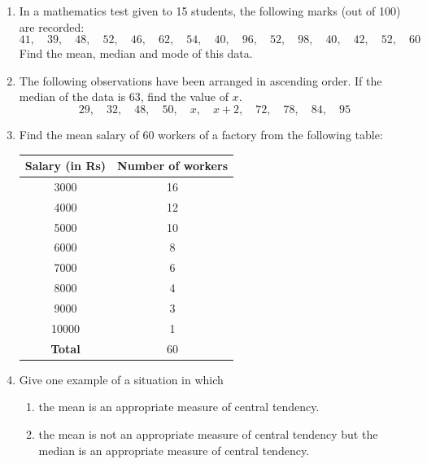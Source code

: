 \documentclass[a4paper,leqno,12pt]{amsart}
\begin{document}
\begin{enumerate}
\item In a mathematics test given to 15 students, the following marks (out of 100) are
recorded:
\[
41, \quad 39,\quad 48,\quad 52,\quad 46,\quad 62,\quad 54,\quad 40,\quad 96,\quad 52,\quad 98,\quad 40,\quad 42,\quad 52,\quad 60
\]
Find the mean, median and mode of this data.

\item The following observations have been arranged in ascending order. If the median of
the data is 63, find the value of $x$.
\[
29,\quad 32,\quad 48,\quad 50,\quad x,\quad x + 2,\quad 72,\quad 78,\quad 84,\quad 95
\]

\item Find the mean salary of 60 workers of a factory from the following table:

\begin{center}
\begin{tabular}{|c|c|}
 \hline
 \textbf{Salary (in Rs)} & \textbf{Number of workers} \\
 \hline
 3000 & 16 \\
 4000 & 12 \\
 5000 & 10 \\
 6000 & 8 \\
 7000 & 6 \\
 8000 & 4 \\
 9000 & 3 \\
 10000 & 1 \\
 \hline
 \textbf{Total} & 60\\
 \hline
\end{tabular}
\end{center}

\item Give one example of a situation in which
\begin{enumerate}
 \item the mean is an appropriate measure of central tendency.
 \item the mean is not an appropriate measure of central tendency but the median is an
appropriate measure of central tendency.
\end{enumerate}


\end{enumerate}


\end{document}
